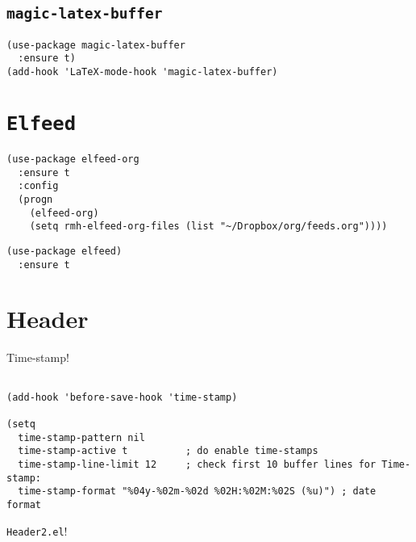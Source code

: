 \documentclass[11pt]{article}
\begin{document}
\subsection{\texttt{magic-latex-buffer}}
\label{sec:org4f61b43}

\begin{verbatim}
(use-package magic-latex-buffer
  :ensure t)
(add-hook 'LaTeX-mode-hook 'magic-latex-buffer)
\end{verbatim}
\section{\texttt{Elfeed}}
\label{sec:org70b271b}

\begin{verbatim}
(use-package elfeed-org
  :ensure t
  :config
  (progn
    (elfeed-org)
    (setq rmh-elfeed-org-files (list "~/Dropbox/org/feeds.org"))))
\end{verbatim}

\begin{verbatim}
(use-package elfeed)
  :ensure t
\end{verbatim}
\section{Header}
\label{sec:orgbe33a77}

Time-stamp!

\begin{verbatim}

(add-hook 'before-save-hook 'time-stamp)

(setq
  time-stamp-pattern nil
  time-stamp-active t          ; do enable time-stamps
  time-stamp-line-limit 12     ; check first 10 buffer lines for Time-stamp:
  time-stamp-format "%04y-%02m-%02d %02H:%02M:%02S (%u)") ; date format
\end{verbatim}

\texttt{Header2.el}!
\end{document}
